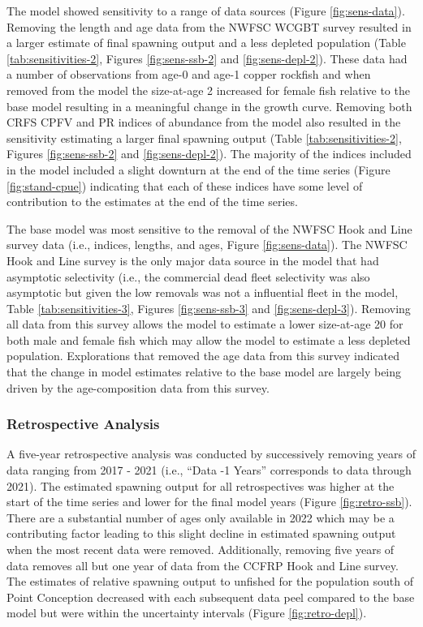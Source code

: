 \documentclass[11pt,
  english,
  letterpaper,
]{article}
\begin{document}
The model showed sensitivity to a range of data sources (Figure \ref{fig:sens-data}). Removing the length and age data from the NWFSC WCGBT survey resulted in a larger estimate of final spawning output and a less depleted population (Table \ref{tab:sensitivities-2}, Figures \ref{fig:sens-ssb-2} and \ref{fig:sens-depl-2}). These data had a number of observations from age-0 and age-1 copper rockfish and when removed from the model the size-at-age 2 increased for female fish relative to the base model resulting in a meaningful change in the growth curve. Removing both CRFS CPFV and PR indices of abundance from the model also resulted in the sensitivity estimating a larger final spawning output (Table \ref{tab:sensitivities-2}, Figures \ref{fig:sens-ssb-2} and \ref{fig:sens-depl-2}). The majority of the indices included in the model included a slight downturn at the end of the time series (Figure \ref{fig:stand-cpue}) indicating that each of these indices have some level of contribution to the estimates at the end of the time series.

The base model was most sensitive to the removal of the NWFSC Hook and Line survey data (i.e., indices, lengths, and ages, Figure \ref{fig:sens-data}). The NWFSC Hook and Line survey is the only major data source in the model that had asymptotic selectivity (i.e., the commercial dead fleet selectivity was also asymptotic but given the low removals was not a influential fleet in the model, Table \ref{tab:sensitivities-3}, Figures \ref{fig:sens-ssb-3} and \ref{fig:sens-depl-3}). Removing all data from this survey allows the model to estimate a lower size-at-age 20 for both male and female fish which may allow the model to estimate a less depleted population. Explorations that removed the age data from this survey indicated that the change in model estimates relative to the base model are largely being driven by the age-composition data from this survey.

\hypertarget{retrospective-analysis}{%
\subsubsection{Retrospective Analysis}\label{retrospective-analysis}}

A five-year retrospective analysis was conducted by successively removing years of data ranging from 2017 - 2021 (i.e., ``Data -1 Years'' corresponds to data through 2021). The estimated spawning output for all retrospectives was higher at the start of the time series and lower for the final model years (Figure \ref{fig:retro-ssb}). There are a substantial number of ages only available in 2022 which may be a contributing factor leading to this slight decline in estimated spawning output when the most recent data were removed. Additionally, removing five years of data removes all but one year of data from the CCFRP Hook and Line survey. The estimates of relative spawning output to unfished for the population south of Point Conception decreased with each subsequent data peel compared to the base model but were within the uncertainty intervals (Figure \ref{fig:retro-depl}).
\end{document}
